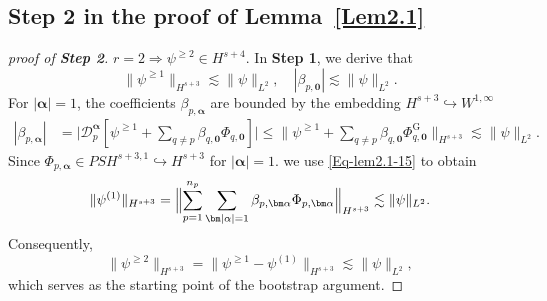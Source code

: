 \documentclass{sn-jnl}%
\numberwithin{equation}{section}
\theoremstyle{thmstyleone}%
\theoremstyle{thmstyletwo}%
\theoremstyle{thmstylethree}%
\begin{document}
\begin{appendices}
\section{Step 2 in the proof of Lemma~\ref{Lem2.1}}
\label{proofthmAR1}
\begin{proof}[proof of \textbf{Step 2}]
$r=2\Rightarrow \psi^{\geq 2} \in H^{s+4}$.
    In \textbf{Step 1}, we derive that 
    \[ \|\psi^{\geq 1}\|_{H^{s+3}}\lesssim\|\psi\|_{L^2},\quad | \beta_{p,\bm 0}|\lesssim \|\psi\|_{L^2}.
    \]
    For $|\bm \alpha| = 1$, the coefficients $\beta_{p,\bm \alpha}$ are bounded by the  embedding $H^{s+3}\hookrightarrow W^{1,\infty}$
    \begin{equation}\label{Eq-lem2.1-15}
    \begin{aligned}
        |\beta_{p,\bm \alpha}|
        &=\bigl|\mathcal{D}^{\bm \alpha}_p[\psi^{\geq 1}+\sum_{q\neq p}\beta_{q,\bm 0}\Phi_{q,\bm 0}]\bigr|
        \leq \bigl\|\psi^{\geq 1}+\sum_{q\neq p}\beta_{q,\bm 0}\Phi_{q,\bm 0}^{\mathrm{G}}\bigr\|_{H^{s+3}}
        \lesssim \|\psi\|_{L^2}.
    \end{aligned}
    \end{equation}
     Since $\Phi_{p,\bm \alpha}\in PSH^{s+3,1}\hookrightarrow H^{s+3}$ for $|\bm \alpha|=1$. we use \eqref{Eq-lem2.1-15} to obtain
     \begin{equation}\label{Eq-lem2.1-16}
        \|\psi^{(1)}\|_{H^{s+3}} =\Bigl\| \sum_{p=1}^{n_p}\sum_{\bm |\alpha|  =1}\beta_{p,\bm \alpha}\Phi_{p,\bm \alpha}\Bigr\|_{H^{s+3}}\lesssim \|\psi\|_{L^2}.
    \end{equation}
    Consequently,
    \begin{equation}
        \|\psi^{\geq 2}\|_{H^{s+3}} =\|\psi^{\geq 1} - \psi^{(1)}\|_{H^{s+3}}\lesssim \|\psi\|_{L^2},
    \end{equation}
    which serves as the starting point of the bootstrap argument. 
    

\end{proof}
\end{appendices}
\end{document}

